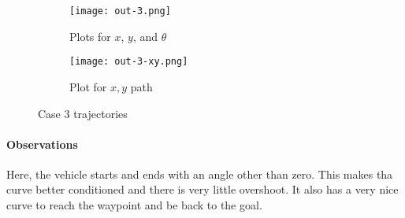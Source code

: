 \begin{figure}[ht]
    \centering
    \begin{subfigure}[b]{0.3\textwidth}
        \texttt{[image: out-3.png]}
        \caption{Plots for $x$, $y$, and $\theta$}
    \end{subfigure}
    \begin{subfigure}[b]{0.6\textwidth}
        \texttt{[image: out-3-xy.png]}
        \caption{Plot for $x, y$ path}
    \end{subfigure}
    \caption{Case 3 trajectories}
    \label{fig:case-3-traj}
\end{figure}

\paragraph*{Observations}
Here, the vehicle starts and ends with an angle other than zero. This makes tha curve better conditioned and there is very little overshoot. It also has a very nice curve to reach the waypoint and be back to the goal.
